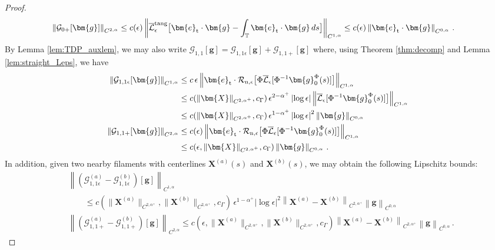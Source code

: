 \documentclass[11pt,reqno]{amsart}
\newcommand{\T}{\mathbb{T}}
\newcommand{\X}{\bm{X}}
\newcommand{\be}{\bm{e}}
\newcommand{\abs}[1]{\left\lvert #1 \right\rvert}
\newcommand{\norm}[1]{\left\lVert #1 \right\rVert}
\newcommand{\mc}[1]{\mathcal{#1}}
\theoremstyle{definition}
\begin{document}
\begin{proof}
\begin{equation}
\begin{aligned}
  \norm{\mc{G}_{0+}[\bm{g}]}_{C^{2,\alpha}} &\le c(\epsilon)\norm{\overline{\mc{L}}_\epsilon^{\rm tang}\big[\be_{\rm t}\cdot\bm{g}-\int_{\T}\be_{\rm t}\cdot\bm{g}\,ds\big]}_{C^{1,\alpha}}
  \le c(\epsilon)\norm{\be_{\rm t}\cdot\bm{g}}_{C^{0,\alpha}}\,.
\end{aligned}
\end{equation}
%
%
By Lemma \ref{lem:TDP_auxlem}, we may also write $\mc{G}_{1,1}[\bm{g}]=\mc{G}_{1,1\epsilon}[\bm{g}]+\mc{G}_{1,1+}[\bm{g}]$ where, using Theorem \ref{thm:decomp} and Lemma \ref{lem:straight_Leps}, we have
\begin{equation}
\begin{aligned}
  \norm{\mc{G}_{1,1\epsilon}[\bm{g}]}_{C^{1,\alpha}} &\le c\,\epsilon\norm{\be_{\rm t}\cdot\mc{R}_{\rm n,\epsilon}\big[\Phi\overline{\mc{L}}_\epsilon[\Phi^{-1}\bm{g}_0^\Phi(s)]\big]}_{C^{1,\alpha}}\\
  &\le c(\|\X\|_{C^{2,\alpha^+}},c_\Gamma)\,\epsilon^{2-\alpha^+}\abs{\log\epsilon}\norm{\overline{\mc{L}}_\epsilon[\Phi^{-1}\bm{g}_0^\Phi(s)]\big]}_{C^{1,\alpha}}\\
  &\le c(\|\X\|_{C^{2,\alpha^+}},c_\Gamma)\,\epsilon^{1-\alpha^+}\abs{\log\epsilon}^2\norm{\bm{g}}_{C^{0,\alpha}}\\
  \norm{\mc{G}_{1,1+}[\bm{g}]}_{C^{2,\alpha}} &\le 
  c(\epsilon)\norm{\be_{\rm t}\cdot\mc{R}_{\rm n,\epsilon}\big[\Phi\overline{\mc{L}}_\epsilon[\Phi^{-1}\bm{g}_0^\Phi(s)]\big]}_{C^{1,\alpha}} \\
  &\le c(\epsilon,\|\X\|_{C^{2,\alpha^+}},c_\Gamma)\norm{\bm{g}}_{C^{0,\alpha}}\,.
\end{aligned}
\end{equation}
In addition, given two nearby filaments with centerlines $\X^{(a)}(s)$ and $\X^{(b)}(s)$, we may obtain the following Lipschitz bounds: 
\begin{equation}
\begin{aligned}
  &\norm{(\mc{G}_{1,1\epsilon}^{(a)}-\mc{G}_{1,1\epsilon}^{(b)})[\bm{g}]}_{C^{1,\alpha}} \\
  &\qquad \le c(\|\X^{(a)}\|_{C^{2,\alpha^+}},\|\X^{(b)}\|_{C^{2,\alpha^+}},c_\Gamma)\,\epsilon^{1-\alpha^+}\abs{\log\epsilon}^2\norm{\X^{(a)}-\X^{(b)}}_{C^{2,\alpha^+}}\norm{\bm{g}}_{C^{0,\alpha}}\\
  &\norm{(\mc{G}_{1,1+}^{(a)}-\mc{G}_{1,1+}^{(b)})[\bm{g}]}_{C^{2,\alpha}} 
  \le c(\epsilon,\|\X^{(a)}\|_{C^{2,\alpha^+}},\|\X^{(b)}\|_{C^{2,\alpha^+}},c_\Gamma)\norm{\X^{(a)}-\X^{(b)}}_{C^{2,\alpha^+}}\norm{\bm{g}}_{C^{0,\alpha}}\,.
\end{aligned}

\end{equation}
\end{proof}
\end{document}
